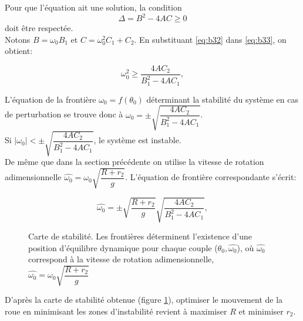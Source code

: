 Pour que l'équation ait une solution, la condition 
\begin{equation}
    \Delta=B^2-4AC \geq 0
\label{eq:b33}
\end{equation}
doit être respectée.\\
Notons $B=\omega_0 B_1$ et $C=\omega_0^2 C_1 + C_2$.
En substituant \ref{eq:b32} dans \ref{eq:b33}, on obtient:

\begin{equation}
    \omega_0^2\geq \frac{4AC_2}{B_1^2-4AC_1},
\end{equation}

L'équation de la frontière $\omega_0=f(\theta_0)$ déterminant la stabilité du système en cas de perturbation se trouve donc à $\omega_0 =\pm \sqrt{\dfrac{4AC_2}{B_1^2-4AC_1}}$.\\
Si $|\omega_0|< \pm \sqrt{\dfrac{4AC_2}{B_1^2-4AC_1}}$, le système est instable.
\\
De même que dans la section précédente on utilise la vitesse de rotation adimensionnelle $\hat{\omega_0}=\omega_0 \sqrt{\dfrac{R+r_2}{g}}$. L'équation de frontière correspondante s'écrit: 

\begin{equation}
    \hat{\omega_0} =\pm \sqrt{\frac{R+r_2}{g}} \sqrt{\frac{4AC_2}{B_1^2-4AC_1}},
\end{equation}

\begin{figure}[h]
\def\svgwidth{250}

\def\svgwidth{250}

\caption{Carte de stabilité. Les frontières déterminent l'existence d'une position d'équilibre dynamique pour chaque couple ($\theta_0,\hat{\omega_0}$), où $\hat{\omega_0}$ correspond à la vitesse de rotation adimensionnelle, $\hat{\omega_0}=\omega_0 \sqrt{\dfrac{R+r_2}{g}}$}
\label{fig:cartestab}
\end{figure}

D'après la carte de stabilité obtenue (figure \ref{fig:cartestab}), optimiser le mouvement de la roue en minimisant les zones d'instabilité revient à maximiser $R$ et minimiser $r_2$.